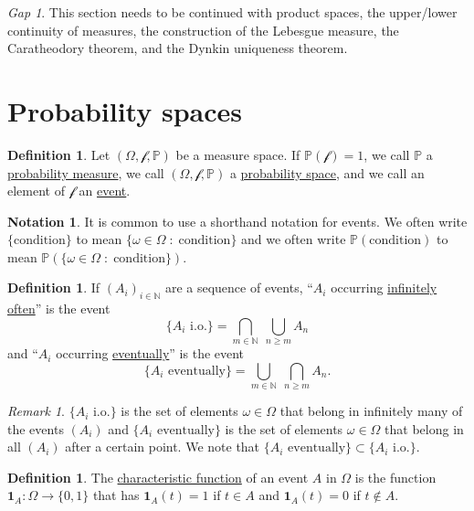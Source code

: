 \documentclass[11pt]{article}
\newcommand{\col}[1]{\mathscr{#1}}
\newcommand{\p}{\mathbb{P}}
\newcommand{\charf}[1]{\mathbf{1}_{#1}}
\newcommand{\defname}[1]{\underline{#1}}
\newcommand{\NN}{\mathbb{N}}
\theoremstyle{theorem}
\theoremstyle{definition}
\newtheorem{definition}[theorem]{Definition}
\newtheorem{notation}[theorem]{Notation}
\theoremstyle{remark}
\newtheorem*{remark}{Remark}
\theoremstyle{step}
\theoremstyle{gap}
\newtheorem*{gap}{Gap}
\begin{document}
\begin{gap} This section needs to be continued with product spaces, the upper/lower continuity of measures, the construction of the Lebesgue measure, the Caratheodory theorem, and the Dynkin uniqueness theorem.\end{gap}

\section{Probability spaces}

\begin{definition}
Let \((\Omega, \col{f}, \p)\) be a measure space. If \(\p(\col{f}) = 1\), we call \(\p\) a \defname{probability measure}, we call \((\Omega, \col{f}, \p)\) a \defname{probability space}, and we call an element of \(\col{f}\) an \defname{event}.
\end{definition}

\begin{notation}
It is common to use a shorthand notation for events. We often write \(\{\text{condition}\}\) to mean \(\{\omega \in \Omega\;:\;\text{condition}\}\) and we often write \(\p(\text{condition})\) to mean \(\p\left(\{\omega \in \Omega\;:\;\text{condition}\}\right)\).
\end{notation}

\begin{definition}
If \((A_i)_{i \in \NN}\) are a sequence of events, ``\(A_i\) occurring \defname{infinitely often}'' is the event
\[\{A_i \text{ i.o.}\} = \bigcap_{m \in \NN} \;\bigcup_{n \geq m} A_n\]
and ``\(A_i\) occurring \defname{eventually}'' is the event
\[\{A_i \text{ eventually}\} = \bigcup_{m \in \NN} \;\bigcap_{n \geq m} A_n.\]
\end{definition}

\begin{remark}
\(\{A_i \text{ i.o.}\}\) is the set of elements \(\omega \in \Omega\) that belong in infinitely many of the events \((A_i)\) and \(\{A_i \text{ eventually}\}\) is the set of elements \(\omega \in \Omega\) that belong in all \((A_i)\) after a certain point. We note that \(\{A_i \text{ eventually}\} \subset \{A_i \text{ i.o.}\}\).
\end{remark}

\begin{definition}
The \defname{characteristic function} of an event \(A\) in \(\Omega\) is the function \(\charf{A}:\Omega \to \{0, 1\}\) that has \(\charf{A}(t) = 1\) if \(t \in A\) and \(\charf{A}(t) = 0\) if \(t \not\in A\).
\end{definition}
\end{document}
